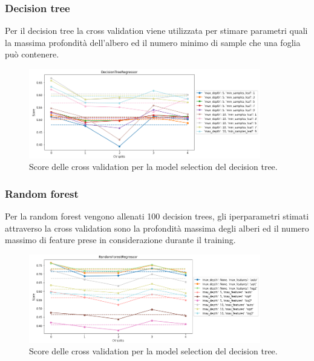 \documentclass{article}
\begin{document}
\subsubsection{Decision tree}
Per il decision tree la cross validation viene utilizzata per stimare parametri
quali la massima profondità dell'albero ed il numero minimo di sample che una
foglia può contenere.
\begin{figure}[ht]
	\centering
	\includegraphics[width=0.9\textwidth]{treecv.png}
	\caption{Score delle cross validation per la model selection del decision
	tree.}
\end{figure}

\subsubsection{Random forest}
Per la random forest vengono allenati 100 decision trees, gli iperparametri
stimati attraverso la cross validation sono la profondità massima degli alberi
ed il numero massimo di feature prese in considerazione durante il training.
\begin{figure}[ht]
	\centering
	\includegraphics[width=0.9\textwidth]{ranfcv.png}
	\caption{Score delle cross validation per la model selection del decision
	tree.}
\end{figure}
\end{document}
